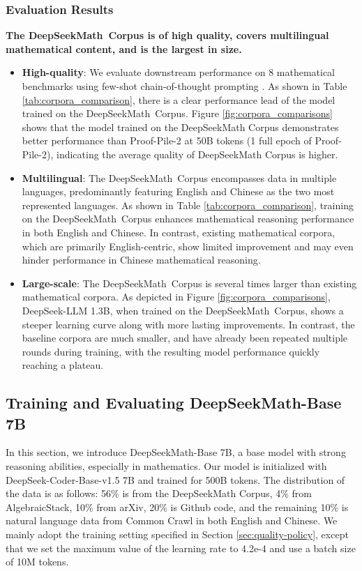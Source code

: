 \subsubsection{Evaluation Results}

\textbf{The DeepSeekMath~Corpus is of high quality, covers multilingual mathematical content, and is the largest in size.}

\begin{itemize}[topsep=0pt]
    \item \textbf{High-quality}:
    We evaluate downstream performance on 8 mathematical benchmarks using few-shot chain-of-thought prompting \cite{cot}. As shown in Table \ref{tab:corpora_comparison}, there is a clear performance lead of the model trained on the DeepSeekMath~Corpus. Figure \ref{fig:corpora_comparisons} shows that the model trained on the DeepSeekMath Corpus demonstrates better performance than Proof-Pile-2 at 50B tokens (1 full epoch of Proof-Pile-2), indicating the average quality of DeepSeekMath Corpus is higher. 
    \item \textbf{Multilingual}:
    The DeepSeekMath~Corpus encompasses data in multiple languages, predominantly featuring English and Chinese as the two most represented languages. As shown in Table \ref{tab:corpora_comparison}, training on the DeepSeekMath~Corpus enhances mathematical reasoning performance in both English and Chinese. In contrast, existing mathematical corpora, which are primarily English-centric, show limited improvement and may even hinder performance in Chinese mathematical reasoning.
    \item \textbf{Large-scale}:
    The DeepSeekMath~Corpus is several times larger than existing mathematical corpora. As depicted in Figure \ref{fig:corpora_comparisons}, DeepSeek-LLM 1.3B, when trained on the DeepSeekMath~Corpus, shows a steeper learning curve along with more lasting improvements. In contrast, the baseline corpora are much smaller, and have already been repeated multiple rounds during training, with the resulting model performance quickly reaching a plateau.
\end{itemize}

\subsection{Training and Evaluating DeepSeekMath-Base 7B}

In this section, we introduce DeepSeekMath-Base 7B, a base model with strong reasoning abilities, especially in mathematics. Our model is initialized with DeepSeek-Coder-Base-v1.5 7B \citep{deepseek-coder} and trained for 500B tokens. The distribution of the data  is as follows: 56\% is from the DeepSeekMath Corpus, 4\% from AlgebraicStack, 10\% from arXiv, 20\% is Github code, and the remaining 10\% is natural language data from Common Crawl in both English and Chinese. We mainly adopt the training setting specified in Section \ref{sec:quality-policy}, except that we set the maximum value of the learning rate to 4.2e-4 and use a batch size of 10M tokens.

